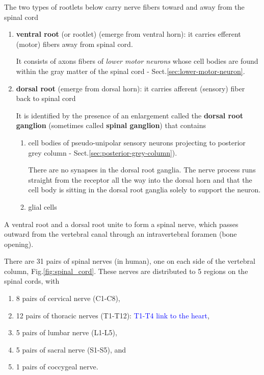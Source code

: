 The two types of rootlets below carry nerve fibers toward and away from the
spinal cord
\begin{enumerate}
  
  \item {\bf ventral root} (or rootlet) (emerge from ventral horn): 
  it carries efferent (motor) fibers away from spinal cord.
  
  It consists of  axons fibers of {\it lower motor neurons} whose cell bodies
  are found within the gray matter of the spinal cord -
  Sect.\ref{sec:lower-motor-neuron}.
  
  \item {\bf dorsal root} (emerge from dorsal horn): it carries afferent
  (sensory) fiber back to spinal cord
  
  It is identified by the presence of an enlargement called the {\bf dorsal root
  ganglion} (sometimes called {\bf spinal ganglion}) that contains
  
  \begin{enumerate}
      \item  cell bodies of pseudo-unipolar sensory neurons projecting to
  posterior grey column - Sect.\ref{sec:posterior-grey-column}). 
  
    There are no synapses in the dorsal root ganglia.
     The nerve process runs straight from the receptor all the way into the
     dorsal horn and that the cell body is sitting in the dorsal root ganglia
     solely to support the neuron.
  
     \item glial cells
  \end{enumerate}
  
\end{enumerate}
A ventral root and a dorsal root unite to form a spinal nerve, which passes
outward from the vertebral canal through an intravertebral foramen (bone
opening).


There are 31 pairs of spinal nerves (in human), one on each side of the
vertebral column, Fig.\ref{fig:spinal_cord}. These nerves are distributed to 5
regions on the spinal cords, with
\begin{enumerate}
  \item  8 pairs of cervical nerve (C1-C8), 
  
  \item 12 pairs of thoracic nerves (T1-T12): \textcolor{blue}{T1-T4 link to
  the heart},
  
  \item 5 pairs of lumbar nerve (L1-L5), 
  
  \item 5 pairs of sacral nerve (S1-S5), and 
  
  \item 1 pairs of coccygeal nerve.
\end{enumerate}


